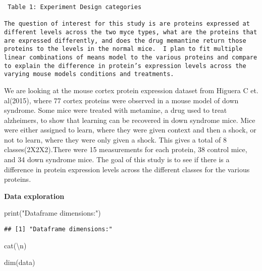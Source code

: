 \documentclass[
]{article}
\newenvironment{Shaded}{\begin{snugshade}}{\end{snugshade}}
\newcommand{\FunctionTok}[1]{\textcolor[rgb]{0.00,0.00,0.00}{#1}}
\newcommand{\NormalTok}[1]{#1}
\newcommand{\SpecialCharTok}[1]{\textcolor[rgb]{0.00,0.00,0.00}{#1}}
\newcommand{\StringTok}[1]{\textcolor[rgb]{0.31,0.60,0.02}{#1}}
\begin{document}
\begin{verbatim}
 Table 1: Experiment Design categories

The question of interest for this study is are proteins expressed at different levels across the two myce types, what are the proteins that are expressed differently, and does the drug memantine return those proteins to the levels in the normal mice.  I plan to fit multiple linear combinations of means model to the various proteins and compare to explain the difference in protein’s expression levels across the varying mouse models conditions and treatments. 
\end{verbatim}

We are looking at the mouse cortex protein expression dataset from
Higuera C et. al(2015), where 77 cortex proteins were observed in a
mouse model of down syndrome. Some mice were treated with metamine, a
drug used to treat alzheimers, to show that learning can be recovered in
down syndrome mice. Mice were either assigned to learn, where they were
given context and then a shock, or not to learn, where they were only
given a shock. This gives a total of 8 classes(2X2X2).There were 15
measurements for each protein, 38 control mice, and 34 down syndrome
mice. The goal of this study is to see if there is a difference in
protein expression levels across the different classes for the various
proteins.

\textbf{Data exploration}

\begin{Shaded}
\begin{Highlighting}[]
\FunctionTok{print}\NormalTok{(}\StringTok{"Dataframe dimensions:"}\NormalTok{)}
\end{Highlighting}
\end{Shaded}

\begin{verbatim}
## [1] "Dataframe dimensions:"
\end{verbatim}

\begin{Shaded}
\begin{Highlighting}[]
\FunctionTok{cat}\NormalTok{(}\StringTok{\textquotesingle{}}\SpecialCharTok{\textbackslash{}n}\StringTok{\textquotesingle{}}\NormalTok{)}
\end{Highlighting}
\end{Shaded}

\begin{Shaded}
\begin{Highlighting}[]
\FunctionTok{dim}\NormalTok{(data)}
\end{Highlighting}
\end{Shaded}
\end{document}
